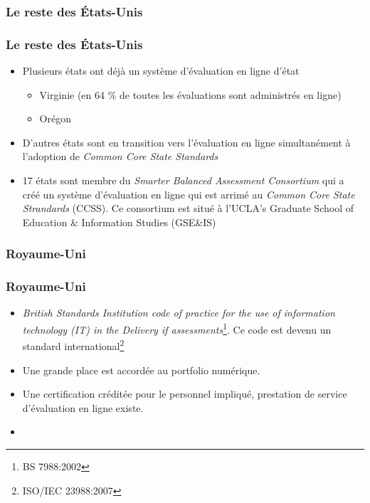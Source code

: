 \documentclass[aspectratio=169]{beamer}
\begin{document}
			\subsubsection{Le reste des États-Unis} 
				\begin{frame}
					  \frametitle{Le reste des États-Unis \citep{NorthCarolina2013}}
				 	\begin {itemize}
						\item Plusieurs états ont déjà un système d'évaluation en ligne d'état
							\begin {itemize}
								\item Virginie (en 64 \% de toutes les évaluations sont administrés en ligne)
								\item Orégon
							\end{itemize}
						\item D'autres états sont en transition vers l'évaluation en ligne simultanément à l'adoption de \textit{Common Core State Standards}
						\item 17 états sont membre du \textit{Smarter Balanced Assessment Consortium} qui a créé un système d'évaluation en ligne qui est arrimé au \textit{Common Core State Strandards} (CCSS). Ce consortium est situé à l'UCLA’s Graduate School of Education \& Information Studies (GSE\&IS)
					\end{itemize}					
				\end{frame}
				
			\subsubsection{Royaume-Uni} 
				\begin{frame}
					  \frametitle{Royaume-Uni \citep{authority2014a}}
				 	\begin {itemize}
						\item \textit{British Standards Institution code of practice for the use of information technology (IT) in the Delivery if assessments}\footnote{BS 7988:2002}. Ce code est devenu un standard international\footnote{ISO/IEC 23988:2007}
						\item Une grande place est accordée au portfolio numérique.
						\item Une certification créditée pour le personnel impliqué, prestation de service d'évaluation en ligne existe.
						\item 
					\end{itemize}					
				\end{frame}
				
\end{document}
